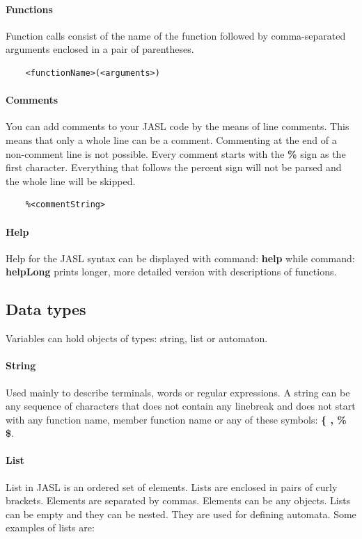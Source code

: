 \documentclass{ctuthesis}
\begin{document}
\paragraph{Functions}
Function calls consist of the name of the function followed by comma-separated arguments enclosed in a pair of parentheses. 
\begin{verbatim}
	<functionName>(<arguments>)
\end{verbatim}

\paragraph{Comments}
You can add comments to your JASL code by the means of line comments. This means that only a whole line can be a comment. Commenting at the end of a non-comment line is not possible. Every comment starts with the \textbf{\%} sign as the first character. Everything that follows the percent sign will not be parsed and the whole line will be skipped. 
\begin{verbatim}
	%<commentString>
\end{verbatim}

\paragraph{Help}
Help for the JASL syntax can be displayed with command: \textbf{help} while command: \textbf{helpLong} prints longer, more detailed version with descriptions of functions. 

\subsection{Data types}
Variables can hold objects of types: string, list or automaton.
\paragraph{String} Used mainly to describe terminals, words or regular expressions. A string can be any sequence of characters that does not contain any linebreak and does not start with any function name, member function name or any of these symbols: \textbf{\{ , \% \$}.
\paragraph{List}
List in JASL is an ordered set of elements. Lists are enclosed in pairs of curly brackets. Elements are separated by commas. Elements can be any objects. Lists can be empty and they can be nested. They are used for defining automata. Some examples of lists are:
\end{document}
